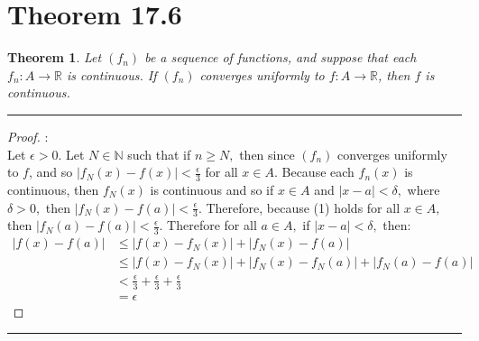 \documentclass[openany, amssymb, psamsfonts]{amsart}
\newcommand{\bbN}{\mathbb{N}}
\newcommand{\bbR}{\mathbb{R}}
\newtheorem{thm}{Theorem}[section]
\theoremstyle{definition}
\numberwithin{equation}{section}
\begin{document}
\section*{Theorem 17.6}
\begin{thm} 
\label{17.6}
	Let $(f_n)$ be a sequence of functions, and suppose that each $f_n\colon A \to \bbR$ is continuous. If $(f_n)$ converges uniformly to $f\colon A \to \bbR$, then $f$ is continuous.
\end{thm}
\vspace{4pt}     \hrule   \vspace{4pt}\begin{proof}:\\
Let $\epsilon>0.$ Let $N \in \bbN$ such that if $n\geq N,$ then since $(f_n)$ converges uniformly to $f$, and so $|f_N(x) - f(x)|< \frac{\epsilon}{3}$ for all $x\in A.$ Because each $f_n(x)$ is continuous, then $f_N(x)$ is continuous and so if $x\in A$ and $|x-a|< \delta,$ where $\delta>0,$ then $|f_N(x) - f(a)|< \frac{\epsilon}{3}.$ Therefore, because (1) holds for all $x\in A,$ then $|f_N(a) - f(a)|< \frac{\epsilon}{3}.$ Therefore for all $a\in A,$ if $|x-a|< \delta,$ then:
\begin{align*}
|f(x) - f(a)|&\leq |f(x) - f_N(x)| + |f_N(x) - f(a)|\\
&\leq |f(x) - f_N(x)| + |f_N(x) - f_N(a)| + |f_N(a) - f(a)|\\
&< \frac{\epsilon}{3} + \frac{\epsilon}{3} + \frac{\epsilon}{3}\\
&= \epsilon
\end{align*}
\end{proof}\vspace{4pt}     \hrule   \vspace{4pt}
\end{document}
